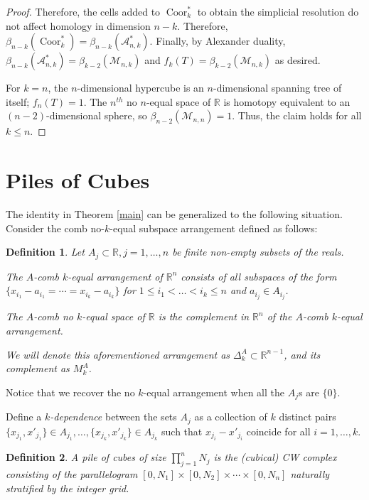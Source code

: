 \documentclass{amsart}
\newcommand{\R}{{\mathbb R}}
\newcommand{\M}{{\mathcal M}_{n, k}}
\newtheorem{defin}{Definition}
\DeclareMathOperator{\Coor}{Coor}
\begin{document}
\begin{proof}
Therefore, the cells added to $\Coor_k^*$ to obtain the simplicial resolution do not affect homology in dimension $n-k$. Therefore, $\beta_{n-k}(\Coor_k^*) = \beta_{n-k} (\mathcal{A}_{n, k}^*)$.
Finally, by Alexander duality, $\beta_{n-k} (\mathcal{A}_{n, k}^*) = \beta_{k-2} (\M)$ and  $f_k(T) = \beta_{k-2} (\M)$ as desired.

For $k = n$, the $n$-dimensional hypercube is an $n$-dimensional spanning tree of itself; $f_n(T) = 1$. The $n^{th}$ no $n$-equal space of $\R$ is homotopy equivalent to an $(n-2)$-dimensional sphere, so $\beta_{n-2} (\mathcal{M}_{n,n}) = 1$. Thus, the claim holds for all $k \leq n$.

\end{proof}

\section{Piles of Cubes} \label{piles}
The identity in Theorem \ref{main} can be generalized to the following situation. Consider the { comb} no-$k$-equal subspace arrangement defined as follows:
\begin{defin}
  Let $A_j\subset \R , j=1,\ldots,n$ be finite non-empty subsets of the reals.
  
  The \emph{$A$-comb $k$-equal arrangement} of $\R^n$ consists of all subspaces of the form $\{x_{i_1} - a_{i_1} = \cdots = x_{i_k} - a_{i_k}\}$ for $1 \leq i_1 < \ldots < i_k \leq n$ and $a_{i_j} \in A_{i_j}$.
  
  The \emph{$A$-comb no $k$-equal space} of $\R$ is the complement in $\R^n$ of the $A$-comb $k$-equal arrangement. 



  We will denote this aforementioned arrangement as $\Delta^A_k\subset\R^{n-1}$, and its complement as $M^A_k$.

\end{defin}

  Notice that we recover the no $k$-equal arrangement when all the $A_j$s are $\{ 0 \}$.

  Define a {\em $k$-dependence} between the sets $A_j$ as a collection of $k$ distinct pairs $\{x_{j_1},x'_{j_1}\}\in A_{j_1}, \ldots, \{x_{j_k},x'_{j_k}\}\in A_{j_k}$
  such that $x_{j_i}-x'_{j_i}$ coincide for all $i=1,\ldots,k$. 

  \begin{defin}
 A {\em pile of cubes of size $\prod_{j=1}^n N_j$} is the (cubical) CW complex consisting of the parallelogram $[0,N_1]\times [0,N_2]\times\cdots\times [0,N_n]$ naturally stratified by the integer grid.
  \end{defin}
  
\end{document}
